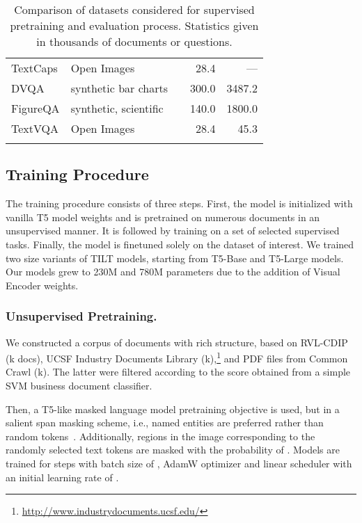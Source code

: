 \documentclass[runningheads]{llncs}
\begin{document}
\begin{table}[ht!]
\begin{tabular}{llcrr}
        TextCaps \cite{sidorov2019textcaps} & Open Images &   & 28.4 & --- \\

        DVQA \cite{kafle2018dvqa} & synthetic bar charts &   & 300.0 & 3487.2 \\

        FigureQA \cite{Kahou2018FigureQAAA} & synthetic, scientific &   & 140.0 & 1800.0 \\

        TextVQA \cite{singh2019towards} & Open Images &   & 28.4 & 45.3 \\
        \bottomrule \\
    \end{tabular}
    \caption{Comparison of datasets considered for supervised pretraining and evaluation process. Statistics given in thousands of documents or questions.\label{tab:datasets-comparison}}
\end{table}

\subsection{Training Procedure}\label{sec:training_procedure}
The training procedure consists of three steps. First, the model is initialized with vanilla T5 model weights and is pretrained on numerous documents in an unsupervised manner. It is followed by training on a set of selected supervised tasks. Finally, the model is finetuned solely on the dataset of interest. We trained two size variants of TILT models, starting from T5-Base and T5-Large models. Our models grew to 230M and 780M parameters due to the addition of Visual Encoder weights.

\subsubsection{Unsupervised Pretraining.} We constructed a corpus of documents with rich structure, based on RVL-CDIP (k docs), UCSF Industry Documents Library (k),\footnote{\url{http://www.industrydocuments.ucsf.edu/}} and PDF files from Common Crawl (k). The latter were filtered according to the score obtained from a simple SVM business document classifier.

Then, a T5-like masked language model pretraining objective is used, but in a salient span masking scheme, i.e., named entities are preferred rather than random tokens~\cite{2020t5,guu2020realm}.
Additionally, regions in the image corresponding to the randomly selected text tokens are masked with the probability of . Models are trained for  steps with batch size of , AdamW optimizer and linear scheduler with an initial learning rate of .
\end{document}
